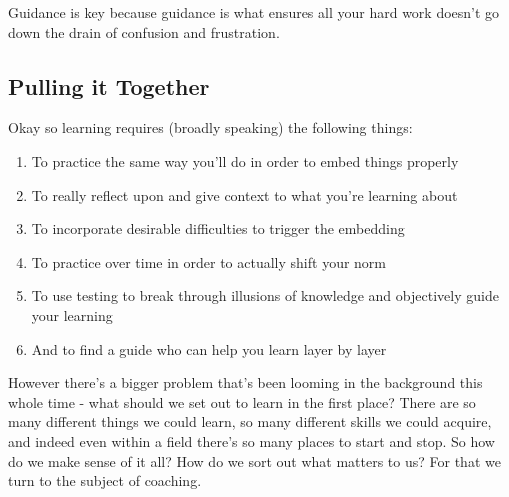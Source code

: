 \documentclass[11pt,a5paper]{book}
\begin{document}
Guidance is key because guidance is what ensures all your hard work doesn't go down the drain of confusion and frustration.

\subsection{Pulling it Together}
Okay so learning requires (broadly speaking) the following things:

\begin{enumerate}
\item To practice the same way you'll do in order to embed things properly
\item To really reflect upon and give context to what you're learning about
\item To incorporate desirable difficulties to trigger the embedding
\item To practice over time in order to actually shift your norm
\item To use testing to break through illusions of knowledge and objectively guide your learning
\item And to find a guide who can help you learn layer by layer
\end{enumerate}

However there's a bigger problem that's been looming in the background this whole time - what should we set out to learn in the first place? There are so many different things we could learn, so many different skills we could acquire, and indeed even within a field there's so many places to start and stop. So how do we make sense of it all? How do we sort out what matters to us? For that we turn to the subject of coaching.
\end{document}
